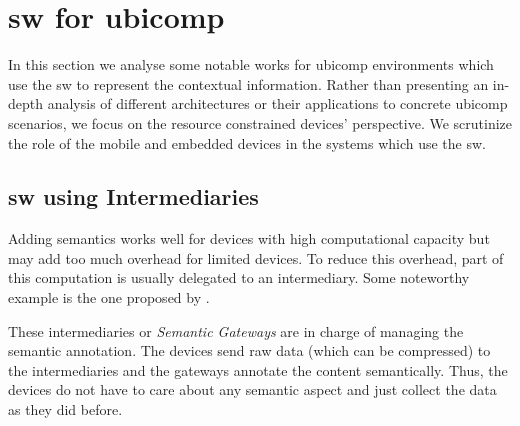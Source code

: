 \section{\acl{sw} for \acl{ubicomp}}
\label{sec:soa_sw_ubicomp}


In this section we analyse some notable works for \ac{ubicomp} environments which use the \ac{sw} to represent the contextual information.
Rather than presenting an in-depth analysis of different architectures or their applications to concrete \ac{ubicomp} scenarios,
we focus on the resource constrained devices' perspective.
We scrutinize the role of the mobile and embedded devices in the systems which use the \ac{sw}.


\subsection{\acl{sw} using Intermediaries}
\label{sec:sw_intermediaries}




Adding semantics works well for devices with high computational capacity but may add too much overhead for limited devices.
To reduce this overhead, part of this computation is usually delegated to an intermediary.
Some noteworthy example is the one proposed by \citet{broring_semantic_2009}.






These intermediaries or \emph{Semantic Gateways} are in charge of managing the semantic annotation.
The devices send raw data (which can be compressed) to the intermediaries and the gateways annotate the content semantically.
Thus, the devices do not have to care about any semantic aspect and just collect the data as they did before.

